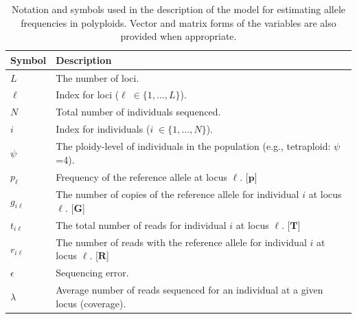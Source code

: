 \documentclass[11pt,english,letterpaper,oneside]{article}
\begin{document}

\singlespacing




\vfill


\begin{table}[b]
\centering
{}
\caption{Notation and symbols used in the description of the model for estimating allele frequencies in polyploids. Vector and matrix forms of the variables are also provided when appropriate.}
\vspace{0.2in}
\bgroup
\def\arraystretch{1.45}
\begin{tabular}[l]{l | l}
\hline
\textbf{Symbol} & \textbf{Description}\\ \hline
$L$ & The number of loci. \\
$\ell$ & Index for loci ($\ell\; \in \{1,\ldots,L\}$). \\
$N$ & Total number of individuals sequenced. \\
$i$ & Index for individuals ($i\; \in \{1,\ldots,N\}$). \\
$\psi$ & The ploidy-level of individuals in the population (e.g., tetraploid: $\psi$=4). \\
$p_{\ell}$ & Frequency of the reference allele at locus $\ell$. [$\bm{p}$] \\
$g_{i \ell}$ & The number of copies of the reference allele for individual $i$ at locus $\ell$. [$\bm{G}$] \\
$t_{i \ell}$ & The total number of reads for individual $i$ at locus $\ell$. [$\bm{T}$] \\
$r_{i \ell}$ & The number of reads with the reference allele for individual $i$ at locus $\ell$. [$\bm{R}$] \\
$\epsilon$ & Sequencing error. \\
$\lambda$ & Average number of reads sequenced for an individual at a given locus (coverage). \\
\hline
\end{tabular}
\egroup
\label{table1}
\end{table}

\end{document}
